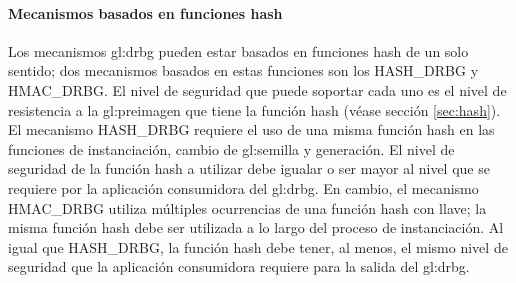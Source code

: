 %
%
\paragraph{Mecanismos basados en funciones hash}

Los mecanismos \gls{gl:drbg} pueden estar basados en funciones hash de un
solo sentido; dos mecanismos basados en estas funciones son los HASH\_DRBG 
y HMAC\_DRBG. El nivel de seguridad que puede soportar cada uno es el nivel de
resistencia a la \gls{gl:preimagen} que tiene la función hash (véase sección
\ref{sec:hash}).
El mecanismo HASH\_DRBG requiere el uso de una misma función hash en las 
funciones de instanciación, cambio de \gls{gl:semilla} y generación. El nivel
de seguridad de la función hash a utilizar debe igualar o ser mayor al
nivel que se requiere por la aplicación consumidora del \gls{gl:drbg}. En
cambio, el mecanismo HMAC\_DRBG utiliza múltiples ocurrencias de una función
hash con llave; la misma función hash debe ser utilizada a lo largo del proceso
de instanciación. Al igual que HASH\_DRBG, la función hash debe tener, al menos,
el mismo nivel de seguridad que la aplicación consumidora requiere para la 
salida del \gls{gl:drbg}.